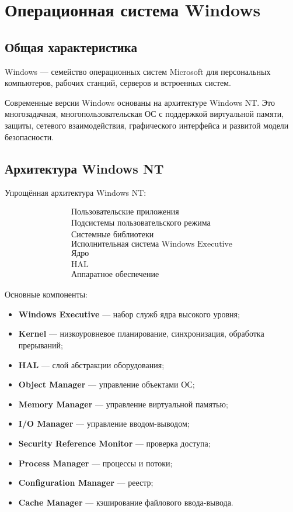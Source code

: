 \documentclass[12pt,a4paper]{article}
\begin{document}
\section{Операционная система Windows}

\subsection{Общая характеристика}

Windows --- семейство операционных систем Microsoft для персональных компьютеров, рабочих станций, серверов и встроенных систем.

Современные версии Windows основаны на архитектуре Windows NT. Это многозадачная, многопользовательская ОС с поддержкой виртуальной памяти, защиты, сетевого взаимодействия, графического интерфейса и развитой модели безопасности.

\subsection{Архитектура Windows NT}

Упрощённая архитектура Windows NT:

\[
\begin{array}{c}
\text{Пользовательские приложения} \\
\hline
\text{Подсистемы пользовательского режима} \\
\hline
\text{Системные библиотеки} \\
\hline
\text{Исполнительная система Windows Executive} \\
\hline
\text{Ядро} \\
\hline
\text{HAL} \\
\hline
\text{Аппаратное обеспечение}
\end{array}
\]

Основные компоненты:

\begin{itemize}
    \item \textbf{Windows Executive} --- набор служб ядра высокого уровня;
    \item \textbf{Kernel} --- низкоуровневое планирование, синхронизация, обработка прерываний;
    \item \textbf{HAL} --- слой абстракции оборудования;
    \item \textbf{Object Manager} --- управление объектами ОС;
    \item \textbf{Memory Manager} --- управление виртуальной памятью;
    \item \textbf{I/O Manager} --- управление вводом-выводом;
    \item \textbf{Security Reference Monitor} --- проверка доступа;
    \item \textbf{Process Manager} --- процессы и потоки;
    \item \textbf{Configuration Manager} --- реестр;
    \item \textbf{Cache Manager} --- кэширование файлового ввода-вывода.
\end{itemize}
\end{document}
